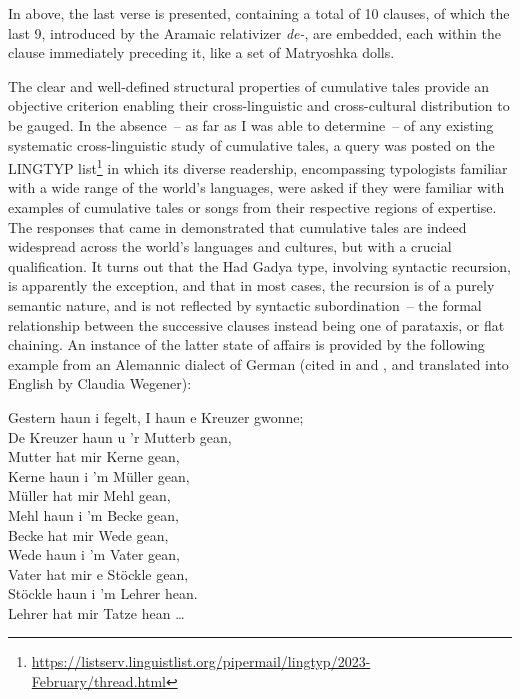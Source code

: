 \documentclass[output=paper,colorlinks,citecolor=brown
]{langscibook}
\begin{document}
\z

In  above, the last verse is presented, containing a total of 10 clauses, of which the last 9, introduced by the Aramaic relativizer \textit{de-}, are embedded, each within the clause immediately preceding it, like a set of Matryoshka dolls.  

The clear and well-defined structural properties of cumulative tales provide an objective criterion enabling their cross-linguistic and cross-cultural distribution to be gauged.  In the absence~– as far as I was able to determine~– of any existing systematic cross-linguistic study of cumulative tales, a query was posted on the LINGTYP list\footnote{\url{https://listserv.linguistlist.org/pipermail/lingtyp/2023-February/thread.html}} in which its diverse readership, encompassing typologists familiar with a wide range of the world's languages, were asked if they were familiar with examples of cumulative  tales or songs from their respective regions of expertise.  The responses that came in demonstrated that cumulative tales are indeed widespread across the world's languages and cultures, but with a crucial qualification.  It turns out that the Had Gadya type, involving syntactic recursion, is apparently the exception, and that in most cases, the recursion is of a purely semantic nature, and is not reflected by syntactic subordination~– the formal relationship between the successive clauses instead being one of parataxis, or flat chaining.  An instance of the latter state of affairs is provided by the following example from an Alemannic dialect of German (cited in 
\cite[65]{meier1851deutsche} and \cite[39]{newell1905passover}, and translated into English by Claudia Wegener):

\ea \label{ex:gil:11}

Gestern haun i fegelt, I haun e Kreuzer gwonne;\\
De Kreuzer haun u 'r Mutterb gean,\\
Mutter hat mir Kerne gean,\\
Kerne haun i 'm Müller gean,\\
Müller hat mir Mehl gean,\\
Mehl haun i 'm Becke gean,\\
Becke hat mir Wede gean,\\
Wede haun i 'm Vater gean,\\
Vater hat mir e Stöckle gean,\\
Stöckle haun i 'm Lehrer hean.\\
Lehrer hat mir Tatze hean  \ldots \\
 
\end{document}
